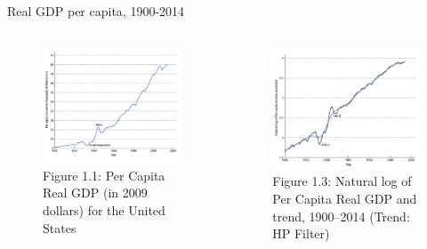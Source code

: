 \documentclass[11pt,aspectratio=169,usenames,dvipsnames]{beamer}
\begin{document}
\begin{frame}{Real GDP per capita, 1900-2014}
\label{slide:Real_GDP_per_capita__1900_2020}
    \begin{columns}
        \begin{column}{0.5\textwidth}
            \begin{figure}
                \caption{Figure 1.1: Per Capita Real GDP (in 2009 dollars) for the United States}
                \includegraphics[width=\textwidth]{./figures/Figure1_1.jpg}
            \end{figure}
        \end{column}
        \begin{column}{0.5\textwidth}
            \begin{figure}
                \caption{Figure 1.3: Natural log of Per Capita Real GDP and trend, 1900–2014 (Trend: HP Filter)}
                \includegraphics[width=\textwidth]{./figures/Figure1_3.jpg}
            \end{figure}
        \end{column}
    \end{columns}
\end{frame}
\end{document}
